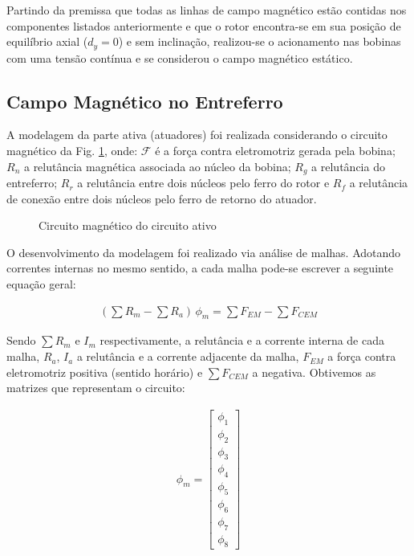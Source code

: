 Partindo da premissa que todas as linhas de campo magnético estão contidas nos componentes listados anteriormente e que o rotor encontra-se em sua posição de equilíbrio axial ($d_y = 0$) e sem inclinação, realizou-se o acionamento nas bobinas com uma tensão contínua e se considerou o campo magnético estático.

\subsection{Campo Magnético no Entreferro}

A modelagem da parte ativa (atuadores) foi realizada considerando o circuito magnético da Fig. \ref{Fig:modelagem:ativo:circuito2}, onde: $\mathcal{F}$ é a força contra eletromotriz gerada pela bobina; $R_n$ a relutância magnética associada ao núcleo da bobina; $R_g$ a relutância do entreferro; $R_r$ a relutância entre dois núcleos pelo ferro do rotor e $R_f$ a relutância de conexão entre dois núcleos pelo ferro de retorno do atuador.

\begin{figure}[h!]
	
	\caption{Circuito magnético do circuito ativo}		\label{Fig:modelagem:ativo:circuito2}
\end{figure}

O desenvolvimento da modelagem foi realizado via análise de malhas. Adotando correntes internas no mesmo sentido, a cada malha pode-se escrever a seguinte equação geral:

\begin{align}
	(\sum R_m  - \sum  R_a ) \, \phi_m = \sum F_{EM} - \sum F_{CEM}
\end{align}

Sendo $\sum R_m$ e $I_m$  respectivamente, a relutância e a corrente interna de cada malha, $R_a$, $I_{a}$ a relutância e a corrente adjacente da malha, $F_{EM}$ a força contra eletromotriz positiva (sentido horário) e $\sum F_{CEM}$ a negativa. Obtivemos as matrizes que representam o circuito:

\begin{align}
	\phi_m = 
	\begin{bmatrix}
	\phi_1 \\ \phi_2 \\  \phi_3 \\  \phi_4 \\  \phi_5 \\  \phi_6 \\  \phi_7 \\  \phi_8
	\end{bmatrix}
\end{align}

